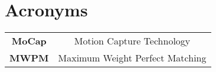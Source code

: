 \section*{\Huge Acronyms}



\begin{table}[H]
    \begin{tabular}{c c}
        \textbf{MoCap} & Motion Capture Technology \\
        \textbf{MWPM} & Maximum Weight Perfect Matching \\
    \end{tabular}
\end{table}